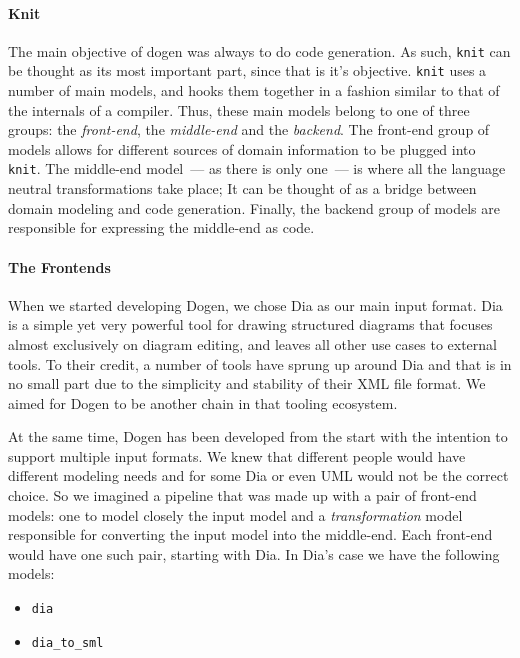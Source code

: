 \documentclass{book}
\begin{document}
\paragraph{Knit}

The main objective of dogen was always to do code generation. As such,
\texttt{knit} can be thought as its most important part, since that is
it's objective. \texttt{knit} uses a number of main models, and hooks
them together in a fashion similar to that of the internals of a
compiler. Thus, these main models belong to one of three groups: the
\emph{front-end}, the \emph{middle-end} and the \emph{backend}. The
front-end group of models allows for different sources of domain
information to be plugged into \texttt{knit}. The middle-end model~---
as there is only one~--- is where all the language neutral
transformations take place; It can be thought of as a bridge between
domain modeling and code generation. Finally, the backend group of
models are responsible for expressing the middle-end as code.

\paragraph{The Frontends}

When we started developing Dogen, we chose Dia as our main input
format. Dia is a simple yet very powerful tool for drawing structured
diagrams that focuses almost exclusively on diagram editing, and
leaves all other use cases to external tools. To their credit, a
number of tools have sprung up around Dia and that is in no small part
due to the simplicity and stability of their XML file format. We aimed
for Dogen to be another chain in that tooling ecosystem.

At the same time, Dogen has been developed from the start with the
intention to support multiple input formats. We knew that different
people would have different modeling needs and for some Dia or even
UML would not be the correct choice. So we imagined a pipeline that
was made up with a pair of front-end models: one to model closely the
input model and a \emph{transformation} model responsible for
converting the input model into the middle-end. Each front-end would
have one such pair, starting with Dia. In Dia's case we have the
following models:

\begin{itemize}
\item \texttt{dia}
\item \texttt{dia\_to\_sml}
\end{itemize}
\end{document}
